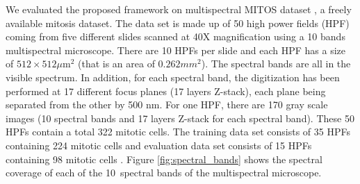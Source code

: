 \documentclass[10pt,twocolumn,letterpaper]{article}
\begin{document}
We evaluated the proposed framework on multispectral MITOS dataset \cite{mITOS2012}, a freely available mitosis dataset. The data set is made up of 50 high power fields (HPF) coming from five different slides scanned at 40X magnification using a 10 bands multispectral microscope. There are 10 HPFs per slide and each HPF has a size of $512\times512\mu\text{m}^2$ (that is an area of $0.262mm^2$). The spectral bands are all in the visible spectrum. In addition, for each spectral band, the digitization has been performed at 17 different focus planes (17 layers Z-stack), each plane being separated from the other by 500 nm. For one HPF, there are 170 gray scale images (10 spectral bands and 17 layers Z-stack for each spectral band). These 50 HPFs contain a total 322 mitotic cells. The training data set consists of 35 HPFs containing 224 mitotic cells and evaluation data set consists of 15 HPFs containing 98 mitotic cells \cite{roux2013}. Figure \ref{fig:spectral_bands} shows the spectral coverage of each of the 10~spectral bands of the multispectral microscope.
\end{document}

